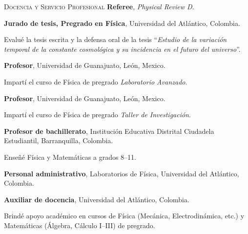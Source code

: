 \begin{rubric}{\faChalkboardTeacher \textsc{Docencia y Servicio Profesional}}
\entry*[2025--presente]
\textbf{Referee}, \textit{Physical Review D}.

\entry*[2024] 
\textbf{Jurado de tesis, Pregrado en Física},  Universidad del Atlántico, Colombia.  \par
Evalué la tesis escrita y la defensa oral de la tesis “\textit{Estudio de la variación temporal de la constante cosmológica y su incidencia en el futuro del universo}”.

\textbf{Profesor}, Universidad de Guanajuato, León, Mexico.\par 
Impartí el curso de Física de pregrado \textit{Laboratorio Avanzado}.

\textbf{Profesor}, Universidad de Guanajuato, León, Mexico.\par 
Impartí el curso de Física de pregrado \textit{Taller de Investigación}.

\entry*[2019--2020] 
\textbf{Profesor de bachillerato}, Institución Educativa Distrital Ciudadela Estudiantil, Barranquilla, Colombia.  \par
Enseñé Física y Matemáticas a grados 8–11.

\entry*[2019--2020] 
\textbf{Personal administrativo}, Laboratorios de Física, Universidad del Atlántico, Colombia.

\entry*[2016--2018] 
\textbf{Auxiliar de docencia}, Universidad del Atlántico, Colombia.  \par
Brindé apoyo académico en cursos de Física (Mecánica, Electrodinámica, etc.) y Matemáticas (Álgebra, Cálculo I–III) de pregrado.

\end{rubric}
